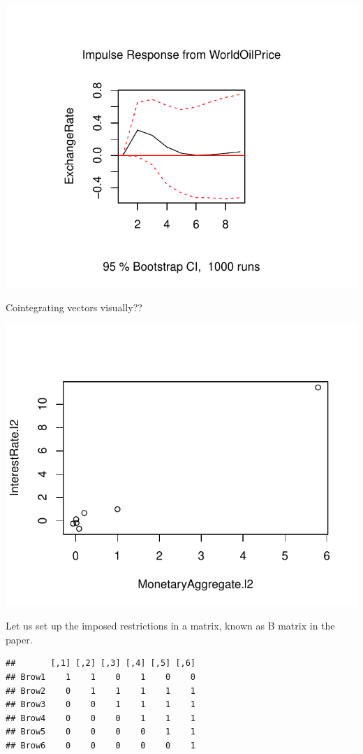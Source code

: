 \documentclass[11pt,preprint, authoryear]{elsarticle}
\numberwithin{equation}{section}
\numberwithin{figure}{section}
\numberwithin{table}{section}
\begin{document}
\begin{center}\includegraphics{README_files/figure-latex/unnamed-chunk-6-5} \end{center}

Cointegrating vectors visually??

\begin{center}\includegraphics{README_files/figure-latex/unnamed-chunk-8-1} \end{center}

Let us set up the imposed restrictions in a matrix, known as B matrix in
the paper.

\begin{verbatim}
##       [,1] [,2] [,3] [,4] [,5] [,6]
## Brow1    1    1    0    1    0    0
## Brow2    0    1    1    1    1    1
## Brow3    0    0    1    1    1    1
## Brow4    0    0    0    1    1    1
## Brow5    0    0    0    0    1    1
## Brow6    0    0    0    0    0    1
\end{verbatim}
\end{document}
